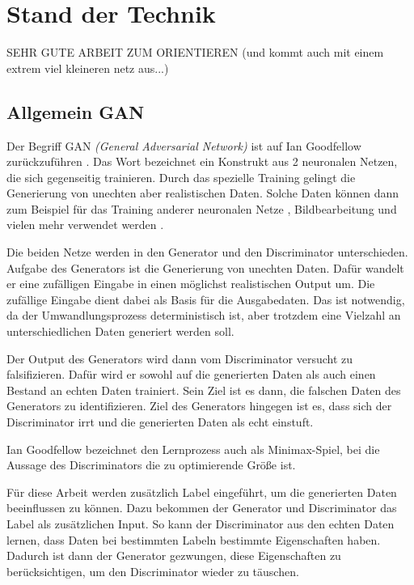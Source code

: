 
\chapter{Stand der Technik}

SEHR GUTE ARBEIT ZUM ORIENTIEREN (und kommt auch mit einem extrem viel kleineren netz aus...) \cite{gan-conditional}

\section{Allgemein GAN}

Der Begriff GAN \textit{(General Adversarial Network)} ist auf Ian Goodfellow zurückzuführen \cite{gan-original-paper}.
Das Wort bezeichnet ein Konstrukt aus 2 neuronalen Netzen, die sich gegenseitig trainieren.
Durch das spezielle Training gelingt die Generierung von unechten aber realistischen Daten.
Solche Daten können dann zum Beispiel für das Training anderer neuronalen Netze \cite{gan-application-augmenting-training-data}, Bildbearbeitung \cite{gan-application-upscaling, gan-application-blending} und vielen mehr verwendet werden \cite{gan-application-dna-optimizes-protein-functions, gan-application-audio-synthesis}.
\newline

Die beiden Netze werden in den Generator und den Discriminator unterschieden.
Aufgabe des Generators ist die Generierung von unechten Daten.
Dafür wandelt er eine zufälligen Eingabe in einen möglichst realistischen Output um.
Die zufällige Eingabe dient dabei als Basis für die Ausgabedaten.
Das ist notwendig, da der Umwandlungsprozess deterministisch ist, aber trotzdem eine Vielzahl an unterschiedlichen Daten generiert werden soll.

Der Output des Generators wird dann vom Discriminator versucht zu falsifizieren.
Dafür wird er sowohl auf die generierten Daten als auch einen Bestand an echten Daten trainiert.
Sein Ziel ist es dann, die falschen Daten des Generators zu identifizieren.
Ziel des Generators hingegen ist es, dass sich der Discriminator irrt und die generierten Daten als echt einstuft.

Ian Goodfellow bezeichnet den Lernprozess auch als Minimax-Spiel, bei die Aussage des Discriminators die zu optimierende Größe ist. \cite{gan-minimax}
\newline

Für diese Arbeit werden zusätzlich Label eingeführt, um die generierten Daten beeinflussen zu können.
Dazu bekommen der Generator und Discriminator das Label als zusätzlichen Input.
So kann der Discriminator aus den echten Daten lernen, dass Daten bei bestimmten Labeln bestimmte Eigenschaften haben.
Dadurch ist dann der Generator gezwungen, diese Eigenschaften zu berücksichtigen, um den Discriminator wieder zu täuschen.

